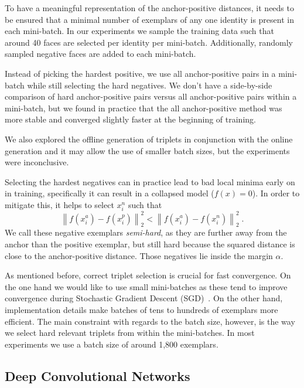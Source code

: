 \documentclass[10pt,twocolumn,letterpaper]{article}
\begin{document}
To have a meaningful representation of the anchor-positive distances, it needs
to be ensured that a minimal number of exemplars of any one identity is present
in each mini-batch. In our experiments we sample the training data such that
around 40 faces are selected per identity per mini-batch. Additionally, randomly
sampled negative faces are added to each mini-batch.

Instead of picking the hardest positive, we use all anchor-positive pairs in a
mini-batch while still selecting the hard negatives.  We don't have a
side-by-side comparison of hard anchor-positive pairs versus all
anchor-positive pairs within a mini-batch, but we found in practice that the
all anchor-positive method was more stable and converged slightly faster at the
beginning of training.

We also explored the offline generation of triplets in conjunction with the
online generation and it may allow the use of smaller batch sizes, but the
experiments were inconclusive.

Selecting the hardest negatives can in practice lead to bad local minima early on in
training, specifically it can result in a collapsed model (\ie $f(x)=0$). In
order to mitigate this, it helps to select $x_i^n$ such that
\begin{equation}\label{eq:semi_hard}
\left\|f(x_i^a)-f(x_i^p)\right\|_2^2<\left\|f(x_i^a)-f(x_i^n)\right\|_2^2\;.
\end{equation}
We call these negative exemplars \emph{semi-hard}, as they are further away
from the anchor than the positive exemplar, but still hard because the squared
distance is close to the anchor-positive distance. Those negatives lie inside
the margin $\alpha$.

As mentioned before, correct triplet selection is crucial for fast convergence.
On the one hand we would like to use small mini-batches as these tend to
improve convergence during Stochastic Gradient Descent
(SGD)~\cite{Wilson.nn03.batch}.  On the other hand, implementation details make
batches of tens to hundreds of exemplars more efficient. The main constraint
with regards to the batch size, however, is the way we select hard relevant
triplets from within the mini-batches. In most experiments we use a batch size
of around 1,800 exemplars.

\subsection{Deep Convolutional Networks} \label{CNN}
\label{architectures}
\end{document}

